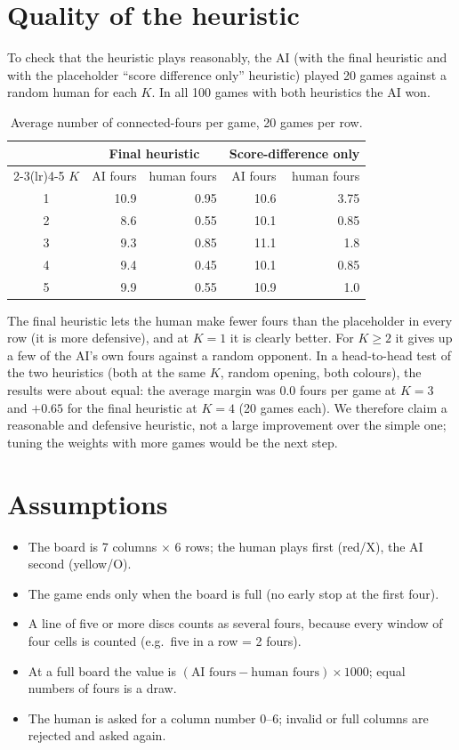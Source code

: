\documentclass[11pt,a4paper]{article}
\begin{document}
\section{Quality of the heuristic}
To check that the heuristic plays reasonably, the AI (with the final heuristic and with
the placeholder ``score difference only'' heuristic) played 20 games against a random
human for each $K$. In all 100 games with both heuristics the AI won.

\begin{table}[H]
\centering
\begin{tabular}{@{}crrrr@{}}
\toprule
 & \multicolumn{2}{c}{Final heuristic} & \multicolumn{2}{c}{Score-difference only}\\
\cmidrule(lr){2-3}\cmidrule(lr){4-5}
$K$ & AI fours & human fours & AI fours & human fours\\
\midrule
1 & 10.9 & 0.95 & 10.6 & 3.75\\
2 & 8.6  & 0.55 & 10.1 & 0.85\\
3 & 9.3  & 0.85 & 11.1 & 1.8\\
4 & 9.4  & 0.45 & 10.1 & 0.85\\
5 & 9.9  & 0.55 & 10.9 & 1.0\\
\bottomrule
\end{tabular}
\caption{Average number of connected-fours per game, 20 games per row.}
\label{tab:heur}
\end{table}

The final heuristic lets the human make fewer fours than the placeholder in every row (it
is more defensive), and at $K=1$ it is clearly better. For $K\ge 2$ it gives up a few of
the AI's own fours against a random opponent. In a head-to-head test of the two
heuristics (both at the same $K$, random opening, both colours), the results were about
equal: the average margin was 0.0 fours per game at $K=3$ and $+0.65$ for the final
heuristic at $K=4$ (20 games each). We therefore claim a reasonable and defensive
heuristic, not a large improvement over the simple one; tuning the weights with more
games would be the next step.

\section{Assumptions}
\begin{itemize}
  \item The board is 7 columns $\times$ 6 rows; the human plays first (red/X), the AI
  second (yellow/O).
  \item The game ends only when the board is full (no early stop at the first four).
  \item A line of five or more discs counts as several fours, because every window of four
  cells is counted (e.g.\ five in a row = 2 fours).
  \item At a full board the value is $(\text{AI fours}-\text{human fours})\times 1000$;
  equal numbers of fours is a draw.
  \item The human is asked for a column number 0--6; invalid or full columns are rejected
  and asked again.
\end{itemize}
\end{document}
